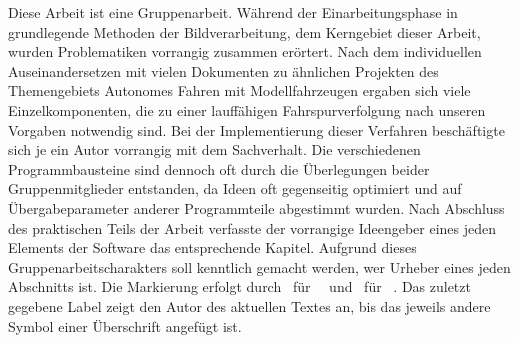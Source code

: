 Diese Arbeit ist eine Gruppenarbeit.
Während der Einarbeitungsphase in grundlegende Methoden der Bildverarbeitung, dem Kerngebiet dieser Arbeit, wurden Problematiken vorrangig zusammen erörtert. Nach dem individuellen Auseinandersetzen mit vielen Dokumenten zu ähnlichen Projekten des Themengebiets \glqq Autonomes Fahren mit Modellfahrzeugen\grqq{} ergaben sich viele Einzelkomponenten, die zu einer lauffähigen Fahrspurverfolgung nach unseren Vorgaben notwendig sind. Bei der Implementierung dieser Verfahren beschäftigte sich je ein Autor vorrangig mit dem Sachverhalt. Die verschiedenen Programmbausteine sind dennoch oft durch die Überlegungen beider Gruppenmitglieder entstanden, da Ideen oft gegenseitig optimiert und auf Übergabeparameter anderer Programmteile abgestimmt wurden. Nach Abschluss des praktischen Teils der Arbeit verfasste der vorrangige Ideengeber eines jeden Elements der Software das entsprechende Kapitel.   
Aufgrund dieses Gruppenarbeitscharakters soll kenntlich gemacht werden, wer Urheber eines jeden Abschnitts ist. Die Markierung erfolgt durch \dcfirstauthorshort\ für \dcfirstauthorfirstname\ \dcfirstauthorlastname\  und \dcsecondauthorshort\  für \dcsecondauthorfirstname\ \dcsecondauthorlastname{}. Das zuletzt gegebene Label zeigt den Autor des aktuellen Textes an, bis das jeweils andere Symbol einer Überschrift angefügt ist.


